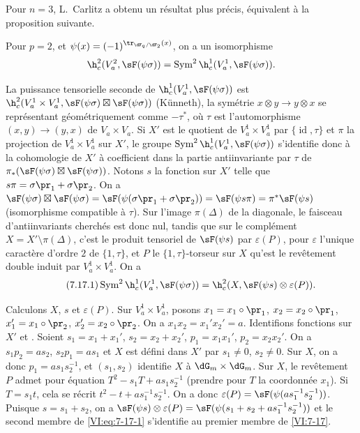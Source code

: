 Pour $n=3$, L.\ Carlitz  a obtenu un résultat plus précis, 
équivalent à la proposition suivante. 





\begin{proposition_}\label{VI:7-17}
Pour $p=2$, et $\psi(x)=(-1)^{\tr_{\dF_q/\dF_2}(x)}$, on a un isomorphisme 
\[
  \h_c^2(V_a^2,\sF(\psi\sigma)) = \operatorname{Sym}^2 \h_c^1(V_a^1,\sF(\psi\sigma)) \text{.} 
\]
\end{proposition_}

La puissance tensorielle seconde de $\h_c^1(V_a^1,\sF(\psi\sigma))$ est 
$\h_c^2(V_a^1\times V_a^1,\sF(\psi\sigma)\boxtimes \sF(\psi\sigma))$ 
(K\"unneth), la symétrie $x\otimes y\to y\otimes x$ se représentant 
géométriquement comme $-\tau^\ast$, où $\tau$ est l'automorphisme 
$(x,y)\to (y,x)$ de $V_a\times V_a$. Si $X'$ est le quotient de 
$V_a^1\times V_a^1$ par $\{\operatorname{id}{},\tau\}$ et $\pi$ la 
projection de $V_a^1\times V_a^1$ sur $X'$, le groupe 
$\operatorname{Sym}^2 \h_c^1(V_a^1,\sF(\psi\sigma))$ s'identifie donc à la 
cohomologie de $X'$ à coefficient dans la partie antiinvariante par $\tau$ de 
$\pi_\ast(\sF(\psi\sigma)\boxtimes \sF(\psi\sigma))$. Notons $s$ la fonction 
sur $X'$ telle que $s\pi =\sigma\pr_1+\sigma\pr_2$. On a 
$\sF(\psi\sigma)\boxtimes \sF(\psi\sigma) = \sF(\psi(\sigma\pr_1+\sigma\pr_2)) = \sF(\psi s \pi) = \pi^\ast \sF(\psi s)$ 
(isomorphisme compatible à $\tau$). Sur l'image $\pi(\Delta)$ de la 
diagonale, le faisceau d'antiinvariants cherchés est donc nul, tandis que sur 
le complément $X=X'\setminus \pi(\Delta)$, c'est le produit tensoriel de 
$\sF(\psi s)$ par $\varepsilon(P)$, pour $\varepsilon$ l'unique caractère 
d'ordre $2$ de $\{1,\tau\}$, et $P$ le $\{1,\tau\}$-torseur sur $X$ qu'est le 
revêtement double induit par $V_a^1\times V_a^1$. On a 
\begin{equation*}\tag{7.17.1}\label{VI:eq:7-17-1}
  \operatorname{Sym}^2 \h_c^1(V_a^1,\sF(\psi\sigma)) = \h_c^2(X,\sF(\psi s)\otimes \varepsilon(P)) \text{.}
\end{equation*}

Calculons $X$, $s$ et $\varepsilon(P)$. Sur $V_a^1\times V_a^1$, posons 
$x_1=x_1\circ\pr_1$, $x_2=x_2\circ\pr_1$, $x_1'=x_1\circ \pr_2$, 
$x_2'=x_2\circ \pr_2$. On a $x_1 x_2=x_1'x_2'=a$. Identifions fonctions sur 
$X'$ et . Soient $s_1=x_1+x_1'$, 
$s_2=x_2+x_2'$, $p_1=x_1 x_1'$, $p_2=x_2 x_2'$. On a $s_1 p_2 = a s_2$, 
$s_2 p_1 = a s_1$ et $X$ est défini dans $X'$ par $s_1\ne 0$, $s_2\ne 0$. Sur 
$X$, on a donc $p_1 = a s_1 s_2^{-1}$, et $(s_1,s_2)$ identifie $X$ à 
$\dG_m\times \dG_m$. Sur $X$, le revêtement $P$ admet pour équation 
$T^2-s_1 T+a s_1 s_2^{-1}$ (prendre pour $T$ la coordonnée $x_1$). Si 
$T=s_1 t$, cela se récrit $t^2-t+a s_1^{-1} s_2^{-1}$. On a donc 
$\varepsilon(P) = \sF(\psi(a s_1^{-1} s_2^{-1}))$. Puisque $s=s_1+s_2$, on a 
$\sF(\psi s)\otimes \varepsilon(P) = \sF(\psi(s_1+s_2+ a s_1^{-1} s_2^{-1}))$ 
et le second membre de \eqref{VI:eq:7-17-1} s'identifie au premier membre de 
\ref{VI:7-17}. 


